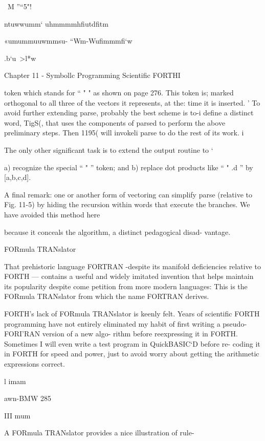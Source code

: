 \ M ”“5"!

 

 

 

 

ntuwwumm‘
uhmmmmhﬁutdﬁtm

«umummuuwmmsu-
“Wm-Wuﬁmmmﬁ‘w

.b‘u~>l*w

Chapter 11 - Symbollc Programming Scientiﬁc FORTHI

token which stands for “ " " as shown on page 276. This token is;
marked orthogonal to all three of the vectors it represents, at the:
time it is inserted. '
To avoid further extending parse, probably the best scheme is to-i
define a distinct word, TigS(, that uses the components of parsed
to perform the above preliminary steps. Then 1195( will invokeli
parse to do the rest of its work. i

The only other significant task is to extend the output routine to ‘

a) recognize the special “ " ” token; and
b) replace dot products like “ " .d ” by [a,b,c,d].

A final remark: one or another form of vectoring can simplify
parse (relative to Fig. 11-5) by hiding the recursion within words
that execute the branches. We have avoided this method here

because it conceals the algorithm, a distinct pedagogical disad-
vantage.

FORmula TRANslator

That prehistoric language FORTRAN -despite its manifold
deficiencies relative to FORTH — contains a useful and widely
imitated invention that helps maintain its popularity despite come
petition from more modern languages: This is the FORmula
TRANslator from which the name FORTRAN derives.

FORTH’s lack of FORmula TRANslator is keenly felt. Years of
scientific FORTH programming have not entirely eliminated my
habit of first writing a pseudo-FORI'RAN version of a new algo-
rithm before reexpressing it in FORTH. Sometimes I will even
write a test program in QuickBASIC‘D before re- coding it in
FORTH for speed and power, just to avoid worry about getting
the arithmetic expressions correct.

l
imam

awn-BMW 285

III mum

A FORmula TRANslator provides a nice illustration of rule-

